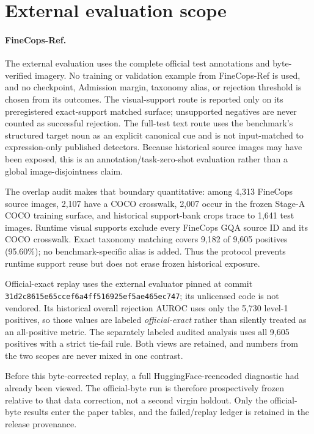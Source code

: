 \section{External evaluation scope}
\label{sup:external}

\paragraph{FineCops-Ref.}
The external evaluation uses the complete official test annotations and
byte-verified imagery.  No training or validation example from FineCops-Ref is
used, and no checkpoint, Admission margin, taxonomy alias, or rejection
threshold is chosen from its outcomes.  The visual-support route is reported
only on its preregistered exact-support matched surface; unsupported negatives
are never counted as successful rejection.  The full-test text route uses the
benchmark's structured target noun as an explicit canonical cue and is not
input-matched to expression-only published detectors.  Because historical source images may have
been exposed, this is an annotation/task-zero-shot evaluation rather than a
global image-disjointness claim.

The overlap audit makes that boundary quantitative: among 4,313 FineCops
source images, 2,107 have a COCO crosswalk, 2,007 occur in the frozen Stage-A
COCO training surface, and historical support-bank crops trace to 1,641 test
images.  Runtime visual supports exclude every FineCops GQA source ID and its
COCO crosswalk.  Exact taxonomy matching covers 9,182 of 9,605 positives
(95.60\%); no benchmark-specific alias is added.  Thus the protocol prevents
runtime support reuse but does not erase frozen historical exposure.

Official-exact replay uses the external evaluator pinned at commit
\texttt{31d2c8615e65ccef6a4ff516925ef5ae465ec747}; its unlicensed code is not
vendored.  Its historical overall rejection AUROC uses only the 5,730
level-1 positives, so those values are labeled \emph{official-exact} rather
than silently treated as an all-positive metric.  The separately labeled
audited analysis uses all 9,605 positives with a strict tie-fail rule.  Both
views are retained, and numbers from the two scopes are never mixed in one
contrast.

Before this byte-corrected replay, a full HuggingFace-reencoded diagnostic had
already been viewed.  The official-byte run is therefore prospectively frozen
relative to that data correction, not a second virgin holdout.  Only the
official-byte results enter the paper tables, and the failed/replay ledger is
retained in the release provenance.

